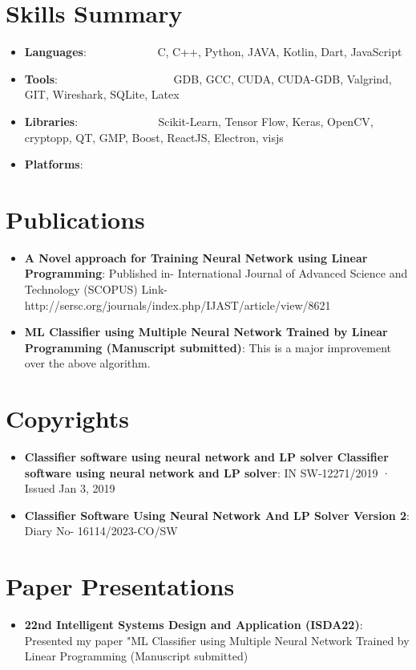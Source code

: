 \documentclass[a4paper,20pt]{article}
\newcommand{\resumeItem}[2]{
  \item\small{
    \textbf{#1}{: #2 \vspace{-2pt}}
  }
}
\newcommand{\resumeSubItem}[2]{\resumeItem{#1}{#2}\vspace{-3pt}}
\newcommand{\resumeSubHeadingListStart}{\begin{itemize}[leftmargin=*]}
\newcommand{\resumeSubHeadingListEnd}{\end{itemize}}
\begin{document}
\section{Skills Summary}
	\resumeSubHeadingListStart
	\resumeSubItem{Languages}{~~~~~~~~~~~~C, C++, Python, JAVA, Kotlin, Dart, JavaScript }
	\resumeSubItem{Tools}{~~~~~~~~~~~~~~~~~~~~GDB, GCC, CUDA, CUDA-GDB, Valgrind, GIT, Wireshark, SQLite, Latex}
	\resumeSubItem{Libraries}{~~~~~~~~~~~~~
Scikit-Learn, Tensor Flow, Keras, OpenCV, cryptopp, QT, GMP, Boost, ReactJS, Electron, visjs}
	\resumeSubItem{Platforms}{~~~~}{~~~~~Linux, Windows}
\resumeSubHeadingListEnd
\vspace{5pt}

\section{Publications}
\resumeSubHeadingListStart
\resumeSubItem{A Novel approach for Training Neural Network using Linear Programming}{Published in- International Journal of Advanced Science and Technology (SCOPUS)
Link- http://sersc.org/journals/index.php/IJAST/article/view/8621}
\resumeSubItem{
ML Classifier using Multiple Neural Network Trained by Linear Programming (Manuscript submitted)}{This is a major improvement over the above algorithm.}
\vspace{2pt}
\resumeSubHeadingListEnd
\vspace{-5pt}

\section{Copyrights}
\resumeSubHeadingListStart
\resumeSubItem{Classifier software using neural network and LP solver Classifier software using neural network and LP solver}{IN SW-12271/2019 · Issued Jan 3, 2019}

\resumeSubItem{
Classifier Software Using Neural Network And LP Solver Version 2}{Diary No- 16114/2023-CO/SW}
\vspace{2pt}
\resumeSubHeadingListEnd
\vspace{-5pt}


\section{Paper Presentations}
  \resumeSubHeadingListStart
	\resumeSubItem
    {22nd Intelligent Systems Design  and Application (ISDA22)}
    {Presented my paper "ML Classifier using Multiple Neural Network Trained by Linear Programming (Manuscript submitted)}{This is a major improvement over the above algorithm"}\\
    \vspace{5pt}
\resumeSubHeadingListEnd
\vspace{-5pt}
\end{document}
